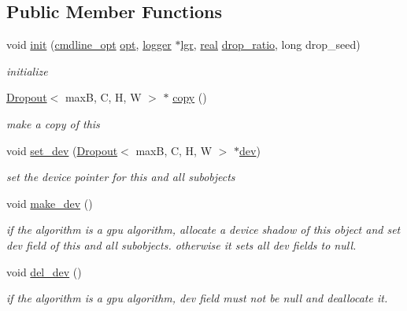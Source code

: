 \subsection*{Public Member Functions}
\begin{DoxyCompactItemize}
\item 
void \hyperlink{structDropout_ab684bc3308abad8598f76bdaaa2598ee}{init} (\hyperlink{structcmdline__opt}{cmdline\+\_\+opt} \hyperlink{structDropout_a3d9589e177c7fd00af8d7e82db651e48}{opt}, \hyperlink{structlogger}{logger} $\ast$\hyperlink{structDropout_a55a275be949499a6f3f27fcb9989964e}{lgr}, \hyperlink{vgg__util_8h_a1082d08aaa761215ec83e7149f27ad16}{real} \hyperlink{structDropout_a4181a1bcb986c62b1c6a82a3c1e03d9f}{drop\+\_\+ratio}, long drop\+\_\+seed)
\begin{DoxyCompactList}\small\item\em initialize \end{DoxyCompactList}\item 
\hyperlink{structDropout}{Dropout}$<$ maxB, C, H, W $>$ $\ast$ \hyperlink{structDropout_a364b0df75c98d5b73fd11a77bf11bf89}{copy} ()
\begin{DoxyCompactList}\small\item\em make a copy of this \end{DoxyCompactList}\item 
void \hyperlink{structDropout_aacd2c2da4fb3bd6718b2b43bc26538b9}{set\+\_\+dev} (\hyperlink{structDropout}{Dropout}$<$ maxB, C, H, W $>$ $\ast$\hyperlink{structDropout_a2ce2e6920dfb911f679af91ff9b6de55}{dev})
\begin{DoxyCompactList}\small\item\em set the device pointer for this and all subobjects \end{DoxyCompactList}\item 
void \hyperlink{structDropout_ad1ea86b3d3240a95c9b8c52756ef23a9}{make\+\_\+dev} ()
\begin{DoxyCompactList}\small\item\em if the algorithm is a gpu algorithm, allocate a device shadow of this object and set dev field of this and all subobjects. otherwise it sets all dev fields to null. \end{DoxyCompactList}\item 
void \hyperlink{structDropout_a34adb045be5a2a9546ff99fec3ba1f30}{del\+\_\+dev} ()
\begin{DoxyCompactList}\small\item\em if the algorithm is a gpu algorithm, dev field must not be null and deallocate it. \end{DoxyCompactList}\item 

\end{DoxyCompactItemize}
